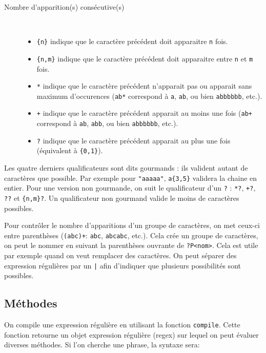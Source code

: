 \documentclass[a4paper, 10pt]{article}
\begin{document}
\begin{description}
\begin{itemize}
    \end{itemize}
    \item [Nombre d'apparition(s) consécutive(s)]~
    \begin{itemize}
        \item \og\texttt{\{n\}}\fg{} indique que le caractère précédent doit apparaitre \texttt{n} fois.
        \item \og\texttt{\{n,m\}}\fg{} indique que le caractère précédent doit apparaitre entre \texttt{n} et \texttt{m} fois.
        \item \og\texttt{*}\fg{} indique que le caractère précédent n'apparait pas ou apparait sans maximum d'occurences (\texttt{ab*} correspond à \texttt{a}, \texttt{ab}, ou bien \texttt{abbbbbb}, etc.).
        \item \og\texttt{+}\fg{} indique que le caractère précédent apparait au moins une fois (\texttt{ab+} correspond à \texttt{ab}, \texttt{abb}, ou bien \texttt{abbbbbb}, etc.).
        \item \og\texttt{?}\fg{} indique que le caractère précédent apparait au plus une fois (équivalent à \texttt{\{0,1\}}).
    \end{itemize}
\end{description}

Les quatre derniers qualificateurs sont dits gourmands : ils valident autant de caractères que possible. Par exemple pour \texttt{"aaaaa"}, \texttt{a\{3,5\}} validera la chaine en entier. Pour une version non gourmande, on suit le qualificateur d'un \texttt{?} : \texttt{*?}, \texttt{+?}, \texttt{??} et \texttt{\{n,m\}?}. Un qualificateur non gourmand valide le moins de caractères possibles.\bigskip

Pour contrôler le nombre d'apparitions d'un groupe de caractères, on met ceux-ci entre parenthèses (\texttt{(abc)+}: \texttt{abc}, \texttt{abcabc}, etc.). Cela crée un groupe de caractères, on peut le nommer en suivant la parenthèses ouvrante de \texttt{?P<nom>}. Cela est utile par exemple quand on veut remplacer des caractères. On peut séparer des expression régulières par un \texttt{|} afin d'indiquer que plusieurs possibilités sont possibles.\bigskip

\subsection{Méthodes}
On compile une expression régulière en utilisant la fonction \texttt{compile}. Cette fonction retourne un objet expression régulière (regex) sur lequel on peut évaluer diverses méthodes. Si l'on cherche une phrase, la syntaxe sera:
\end{document}

